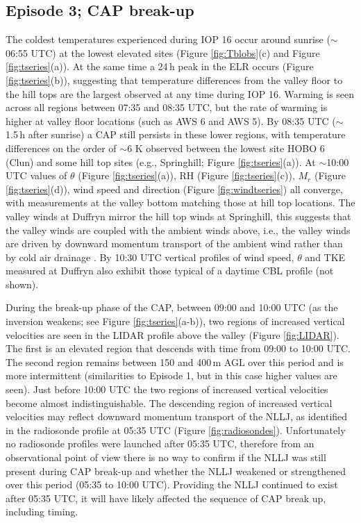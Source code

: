 \documentclass[times]{qjrms4}
\begin{document}
\subsection{Episode 3; CAP break-up}
\label{ep4}
The coldest temperatures experienced during IOP 16 occur around sunrise ($\sim$06:55 UTC) at the lowest elevated sites (Figure \ref{fig:Tblobs}(c) and Figure \ref{fig:tseries}(a)). At the same time a 24$\,\mbox{h}$ peak in the ELR occurs (Figure \ref{fig:tseries}(b)), suggesting that temperature differences from the valley floor to the hill tops are the largest observed at any time during IOP 16. Warming is seen across all regions between 07:35 and 08:35 UTC, but the rate of warming is higher at valley floor locations (such as AWS 6 and AWS 5). By 08:35 UTC ($\sim$1.5$\,\mbox{h}$ after sunrise) a CAP still persists in these lower regions, with temperature differences on the order of $\sim$6 K observed between the lowest site HOBO 6 (Clun) and some hill top sites (e.g., Springhill; Figure \ref{fig:tseries}(a)). At $\sim$10:00 UTC values of $\theta$ (Figure \ref{fig:tseries}(a)), RH (Figure \ref{fig:tseries}(c)), $M_r$ (Figure \ref{fig:tseries}(d)), wind speed and direction (Figure \ref{fig:windtseries}) all converge, with measurements at the valley bottom matching those at hill top locations. The valley winds at Duffryn mirror the hill top winds at Springhill, this suggests that the valley winds are coupled with the ambient winds above, i.e., the valley winds are driven by downward momentum transport of the ambient wind rather than by cold air drainage \citep{whiteman1993relationship}. By 10:30 UTC vertical profiles of wind speed, $\theta$ and TKE measured at Duffryn also exhibit those typical of a daytime CBL profile (not shown).

During the break-up phase of the CAP, between 09:00 and 10:00 UTC (as the inversion weakens; see Figure \ref{fig:tseries}(a-b)), two regions of increased vertical velocities are seen in the LIDAR profile above the valley (Figure \ref{fig:LIDAR}). The first is an elevated region that descends with time from 09:00 to 10:00 UTC. The second region remains between 150 and 400$\,\mbox{m}$ AGL over this period and is more intermittent (similarities to Episode 1, but in this case higher values are seen). Just before 10:00 UTC the two regions of increased vertical velocities become almost indistinguishable. The descending region of increased vertical velocities may reflect downward momentum transport of the NLLJ, as identified in the radiosonde profile at 05:35 UTC (Figure \ref{fig:radiosondes}). Unfortunately no radiosonde profiles were launched after 05:35 UTC, therefore from an observational point of view there is no way to confirm if the NLLJ was still present during CAP break-up and whether the NLLJ weakened or strengthened over this period (05:35 to 10:00 UTC). Providing the NLLJ continued to exist after 05:35 UTC, it will have likely affected the sequence of CAP break up, including timing.
\end{document}
